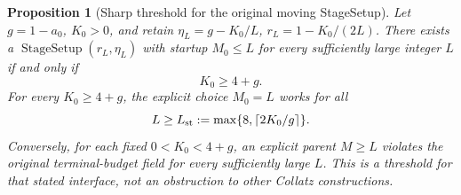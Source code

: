 \documentclass[11pt]{article}
\newtheorem{proposition}{Proposition}
\theoremstyle{remark}\newtheorem{remark}[proposition]{Remark}
\begin{document}
\begin{proposition}[Sharp threshold for the original moving StageSetup]
\label{prop:shaik-exact-moving-startup}
Let \(g=1-a_0\), \(K_0>0\), and retain
\(\eta_L=g-K_0/L\), \(r_L=1-K_0/(2L)\).
There exists a \(\operatorname{StageSetup}(r_L,\eta_L)\) with
startup \(M_0\le L\) for every sufficiently large integer \(L\)
if and only if
\begin{equation}\label{eq:shaik-exact-moving-threshold}
 K_0\ge4+g.
\end{equation}
For every \(K_0\ge4+g\), the explicit choice \(M_0=L\) works for all
\[
 L\ge L_{\rm st}:=\max\{8,\lceil2K_0/g\rceil\}.
\]
Conversely, for each fixed \(0<K_0<4+g\), an explicit parent
\(M\ge L\) violates the original terminal-budget field for every
sufficiently large \(L\).
This is a threshold for that stated interface, not an obstruction
to other Collatz constructions.
\end{proposition}
\end{document}
